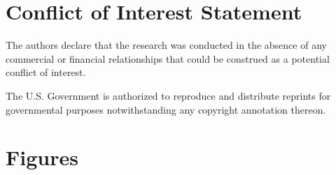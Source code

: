 \documentclass[utf8]{frontiersSCNS}
\begin{document}
\section*{Conflict of Interest Statement}

The authors declare that the research was conducted in the absence of any commercial or financial relationships that could be construed as a potential conflict of interest.

The U.S. Government is authorized to reproduce and distribute reprints for governmental purposes notwithstanding any copyright annotation thereon.
%
%
%
%




\clearpage
\section*{Figures}
\end{document}
